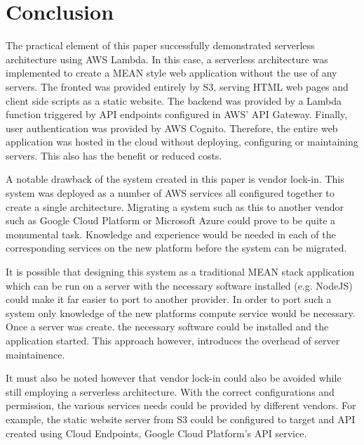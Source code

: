 \section{Conclusion}
  The practical element of this paper successfully demonstrated serverless architecture using AWS Lambda. In this case, a serverless architecture was implemented to create a MEAN style web application without the use of any servers. The fronted was provided entirely by S3, serving HTML web pages and client side scripts as a static website. The backend was provided by a Lambda function triggered by API endpoints configured in AWS' API Gateway. Finally, user authentication was provided by AWS Cognito. Therefore, the entire web application was hosted in the cloud without deploying, configuring or maintaining servers. This also has the benefit or reduced costs.
  
  A notable drawback of the system created in this paper is vendor lock-in. This system was deployed as a number of AWS services all configured together to create a single architecture. Migrating a system such as this to another vendor such as Google Cloud Platform or Microsoft Azure could prove to be quite a monumental task. Knowledge and experience would be needed in each of the corresponding services on the new platform before the system can be migrated. 
  
  It is possible that designing this system as a traditional MEAN stack application which can be run on a server with the necessary software installed (e.g. NodeJS) could make it far easier to port to another provider. In order to port such a system only knowledge of the new platforms compute service would be necessary. Once a server was create. the necessary software could be installed and the application started. This approach however, introduces the overhead of server maintainence.
  
  It must also be noted however that vendor lock-in could also be avoided while still employing a serverless architecture. With the correct configurations and permission, the various services needs could be provided by different vendors. For example, the static website server from S3 could be configured to target and API created using Cloud Endpoints, Google Cloud Platform's API service.